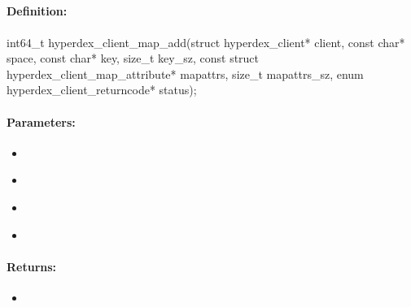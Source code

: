 \pagebreak
\subsection{}
\label{api:c:map_add}


\paragraph{Definition:}
\begin{ccode}
int64_t hyperdex_client_map_add(struct hyperdex_client* client,
        const char* space,
        const char* key, size_t key_sz,
        const struct hyperdex_client_map_attribute* mapattrs, size_t mapattrs_sz,
        enum hyperdex_client_returncode* status);
\end{ccode}

\paragraph{Parameters:}
\begin{itemize}[noitemsep]
\item {}\\

\item {}\\

\item {}\\

\item {}\\

\end{itemize}

\paragraph{Returns:}
\begin{itemize}[noitemsep]
\item {}\\

\end{itemize}

